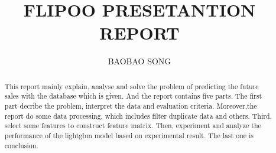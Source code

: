 \documentclass{amsart}
\begin{document}
%
%
\title[Flip00 report]{FLIPOO PRESETANTION REPORT}%

\author{BAOBAO SONG}

%
%
\date{\gitAuthorDate}%

\begin{abstract}
This report mainly explain, analyse and solve the problem of predicting the future sales with the database which is given. And the report contains ﬁve parts. The first part decribe the  problem, interpret the data and evaluation criteria. Moreover,the report do some data processing, which includes filter duplicate data and others. Third, select some features to construct feature matrix. Then, experiment and analyze the performance of the lightgbm model based on experimental result. The last one is conclusion.

\end{abstract}

\maketitle
\tableofcontents

\newpage



\newpage


\end{document}
